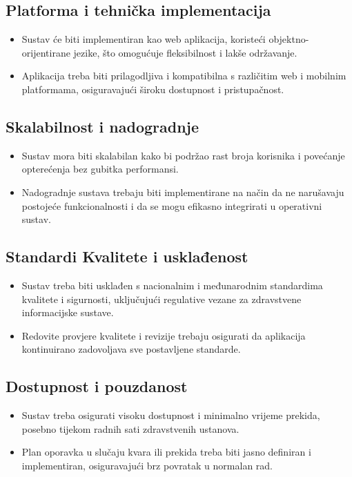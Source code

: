 \documentclass[12pt]{report}
\begin{document}
\subsection*{Platforma i tehnička implementacija}
\begin{itemize}
    \item Sustav će biti implementiran kao web aplikacija, koristeći objektno-orijentirane jezike, što omogućuje fleksibilnost i lakše održavanje.
    \item Aplikacija treba biti prilagodljiva i kompatibilna s različitim web i mobilnim platformama, osiguravajući široku dostupnost i pristupačnost.
\end{itemize}

\subsection*{Skalabilnost i nadogradnje}
\begin{itemize}
    \item Sustav mora biti skalabilan kako bi podržao rast broja korisnika i povećanje opterećenja bez gubitka performansi.
    \item Nadogradnje sustava trebaju biti implementirane na način da ne narušavaju postojeće funkcionalnosti i da se mogu efikasno integrirati u operativni sustav.
\end{itemize}

\subsection*{Standardi Kvalitete i usklađenost}
\begin{itemize}
\item Sustav treba biti usklađen s nacionalnim i međunarodnim standardima kvalitete i sigurnosti, uključujući regulative vezane za zdravstvene informacijske sustave.
\item Redovite provjere kvalitete i revizije trebaju osigurati da aplikacija kontinuirano zadovoljava sve postavljene standarde.
\end{itemize}

\subsection*{Dostupnost i pouzdanost}
\begin{itemize}
\item Sustav treba osigurati visoku dostupnost i minimalno vrijeme prekida, posebno tijekom radnih sati zdravstvenih ustanova.
\item Plan oporavka u slučaju kvara ili prekida treba biti jasno definiran i implementiran, osiguravajući brz povratak u normalan rad.
\end{itemize}
\end{document}
